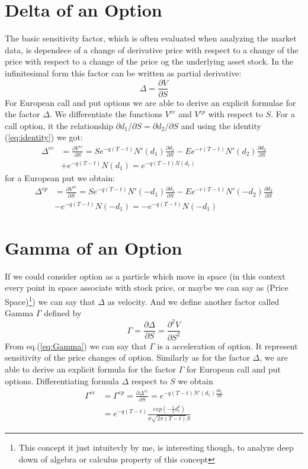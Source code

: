 \documentclass[a4paper]{article}
\begin{document}
\section{Delta of an Option}
The basic sensitivity factor, which is often evaluated when analyzing the market data, is dependece of a change of derivative price with respect to a change of the price
with respect to a change of the price og the underlying asset stock. In the infinitesimal form this factor can be written as partial
derivative:
\begin{equation}
    \Delta = \frac{\partial V}{\partial S}
\end{equation}
For European call and put options we are able to derive an explicit formulae for the factor $\Delta$. We differentiate the functions $V^{ec}$ and $V^{ep}$ with respect to $S$. For a call option, it 
the relationship $\partial d_1/ \partial S = \partial d_2 / \partial S$ and using the identity (\ref{eq:identity}) we got:
\begin{align}
\Delta^{ec} &= \frac{\partial V^{ec}}{\partial S} = Se^{-q(T-t)}N'(d_1) \frac{\partial d_1}{\partial S} - Ee^{-r(T-t)}N'(d_2)\frac{\partial d_2}{\partial S}\\
            &+ e^{-q(T-t)}N(d_1)= e^{-q(T-t)N(d_1)}
\end{align}
for a European put we obtain:
\begin{align}
    \Delta^{ep} &= \frac{\partial V^{ec}}{\partial S} = Se^{-q(T-t)}N'(-d_1)\frac{\partial d_1}{\partial S} - Ee^{-r(T-t)}N'(-d_2)\frac{\partial d_2}{\partial S}\\
    &- e^{-q(T-t)}N(-d_1)=-e^{-q(T-t)}N(-d_1)
\end{align}

\section{Gamma of an Option}
If we could consider option as a particle which move in space (in this context every point in space associate with stock price, or maybe we can say as (Price Space)\footnote{This concept it just intuitevly by me, is interesting though, to analyze deep down of algebra or calculus property of this concept}) we can say that $\Delta$ as velocity. And we define another factor called Gamma $\Gamma$ defined by
\begin{equation}
    \Gamma = \frac{\partial \Delta}{\partial S} = \frac{\partial^2 V}{\partial S^2}
    \label{eq:Gamma}
\end{equation}
From eq.(\ref{eq:Gamma}) we can say that $\Gamma$ is a acceleration of option. It represent sensitivity of the price changes of option. Similarly as for the factor
$\Delta$, we are able to derive an explicit formula for the factor $\Gamma$ for European call and put options. Differentiating formula $\Delta$ respect to $S$ we 
obtain 
\begin{align}
    \Gamma^{ec} &= \Gamma^{ep} = \frac{\partial \Delta^{ec}}{\partial S}= e^{-q(T-t)N'(d_1)\frac{\partial d_1}{\partial S}}\\
                &= e^{-q(T-t)} \frac{exp(-\frac{1}{2}d_1^2)}{\sigma \sqrt{2\pi(T-t)} S}
\end{align}
\end{document}
